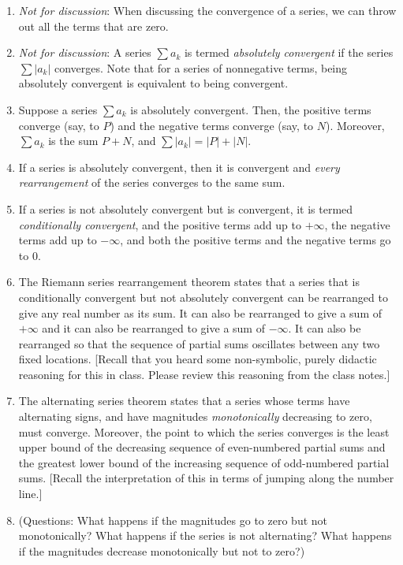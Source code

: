 \documentclass[10pt]{amsart}
\begin{document}
\begin{enumerate}
\item {\em Not for discussion}: When discussing the convergence of a
  series, we can throw out all the terms that are zero.
\item {\em Not for discussion}: A series $\sum a_k$ is termed {\em
  absolutely convergent} if the series $\sum |a_k|$ converges. Note
  that for a series of nonnegative terms, being absolutely convergent
  is equivalent to being convergent.
\item Suppose a series $\sum a_k$ is absolutely convergent. Then, the
  positive terms converge (say, to $P$) and the negative terms
  converge (say, to $N$). Moreover, $\sum a_k$ is the sum $P + N$, and
  $\sum |a_k| = |P| + |N|$.
\item If a series is absolutely convergent, then it is convergent and
  {\em every rearrangement} of the series converges to the same sum.
\item If a series is not absolutely convergent but is convergent, it
  is termed {\em conditionally convergent}, and the positive terms add
  up to $+\infty$, the negative terms add up to $-\infty$, and both
  the positive terms and the negative terms go to $0$.
\item The Riemann series rearrangement theorem states that a series
  that is conditionally convergent but not absolutely convergent can
  be rearranged to give any real number as its sum. It can also be
  rearranged to give a sum of $+\infty$ and it can also be rearranged
  to give a sum of $-\infty$. It can also be rearranged so that the
  sequence of partial sums oscillates between any two fixed
  locations. [Recall that you heard some non-symbolic, purely didactic
  reasoning for this in class. Please review this reasoning from the
  class notes.]
\item The alternating series theorem states that a series whose terms
  have alternating signs, and have magnitudes {\em monotonically}
  decreasing to zero, must converge. Moreover, the point to which the
  series converges is the least upper bound of the decreasing sequence
  of even-numbered partial sums and the greatest lower bound of the
  increasing sequence of odd-numbered partial sums. [Recall the
  interpretation of this in terms of jumping along the number line.]
\item (Questions: What happens if the magnitudes go to zero but not
  monotonically? What happens if the series is not alternating? What
  happens if the magnitudes decrease monotonically but not to zero?)
\end{enumerate}
\end{document}
